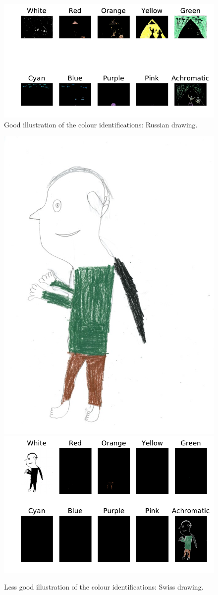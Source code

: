 \documentclass[11pt,a4paper]{article}
\begin{document}
\begin{figure}[!h]
	\centering
	\includegraphics[width=0.62\linewidth]{figures/ru08_bo_f_pb_07_05_ali-rno_filter_mask.pdf}\hfil
	\caption{Good illustration of the colour identifications: Russian drawing.}
	\label{fig:example1}
\end{figure}

\begin{figure}[h!]
	\centering
	\includegraphics[width=0.32\linewidth]{figures/ch15_fr_m_rrs_08_08_fim-r.jpg}
	\includegraphics[width=0.62\linewidth]{figures/ch15_fr_m_rrs_08_08_fim-rno_filter_mask.pdf}
	\caption{Less good illustration of the colour identifications: Swiss drawing.}
	\label{fig:example2}
\end{figure}
\end{document}
